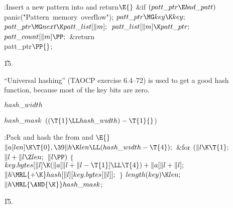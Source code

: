 \B{}:Insert a new pattern into  and
return\X${}\E{}$\6
\&{if} ${}(\\{patt\_ptr}\E\\{bad\_patt}){}$\1\5
\\{panic}(\.{"Pattern\ memory\ over}\)\.{flow"});\2\6
${}\\{patt\_ptr}\MG\\{key}\K\\{key};{}$\6
${}\\{patt\_ptr}\MG\\{next}\K\\{patt\_list}[\|m];{}$\6
${}\\{patt\_list}[\|m]\K\\{patt\_ptr};{}$\6
${}\\{patt\_count}[\|m]\PP;{}$\6
\&{return} \\{patt\_ptr}${}\PP{}$;\par
\U15.\fi

``Universal hashing'' (TAOCP exercise 6.4--72) is used to
get a good hash
function, because most of the key bits are zero.

\Y\B\4\D$\\{hash\_width}$ \5
\par
\B\4\D$\\{hash\_mask}$ \5
$((\T{1}\LL\\{hash\_width})-\T{1}{}$)\par
\Y\B\4:Pack and hash the  from  and \X${}%
\E{}$\6
$\|a[\\{len}]\K\T{0},\39\|h\K\\{len}\LL(\\{hash\_width}-\T{4});{}$\6
\&{for} ${}(\|l\K\T{1};{}$ ${}\|l+\|l\Z\\{len};{}$ ${}\|l\PP){}$\5
${}\{{}$\1\6
${}\\{key}.\\{bytes}[\|l]\K(\|a[\|l+\|l-\T{1}]\LL\T{4})+\|a[\|l+\|l];{}$\6
${}\|h\MRL{+{\K}}\\{hash}[\|l][\\{key}.\\{bytes}[\|l]];{}$\6
\4${}\}{}$\2\6
${}\\{length}(\\{key})\K\\{len};{}$\6
${}\|h\MRL{\AND{\K}}\\{hash\_mask}{}$;\par
\U15.\fi

